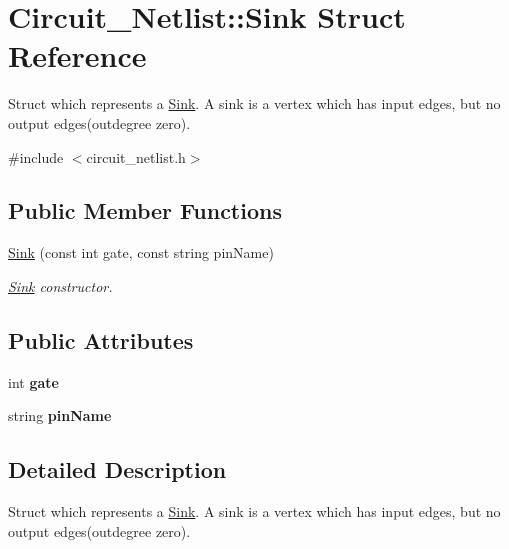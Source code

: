 \hypertarget{structCircuit__Netlist_1_1Sink}{\section{Circuit\-\_\-\-Netlist\-:\-:Sink Struct Reference}
\label{structCircuit__Netlist_1_1Sink}
}


Struct which represents a \hyperlink{structCircuit__Netlist_1_1Sink}{Sink}. A sink is a vertex which has input edges, but no output edges(outdegree zero).  




{\ttfamily \#include $<$circuit\-\_\-netlist.\-h$>$}

\subsection*{Public Member Functions}
\begin{DoxyCompactItemize}
\item 
\hyperlink{structCircuit__Netlist_1_1Sink_ad56d7d6a65455ec3e328d4bb8876936f}{Sink} (const int gate, const string pin\-Name)
\begin{DoxyCompactList}\small\item\em \hyperlink{structCircuit__Netlist_1_1Sink}{Sink} constructor. \end{DoxyCompactList}\end{DoxyCompactItemize}
\subsection*{Public Attributes}
\begin{DoxyCompactItemize}
\item 
\hypertarget{structCircuit__Netlist_1_1Sink_a5728898bf1ef8a37b46f0f6274676889}{int {\bfseries gate}}\label{structCircuit__Netlist_1_1Sink_a5728898bf1ef8a37b46f0f6274676889}

\item 
\hypertarget{structCircuit__Netlist_1_1Sink_ac2072a83f3d654b10f6ad0b2049cc2e6}{string {\bfseries pin\-Name}}\label{structCircuit__Netlist_1_1Sink_ac2072a83f3d654b10f6ad0b2049cc2e6}

\end{DoxyCompactItemize}


\subsection{Detailed Description}
Struct which represents a \hyperlink{structCircuit__Netlist_1_1Sink}{Sink}. A sink is a vertex which has input edges, but no output edges(outdegree zero). 



